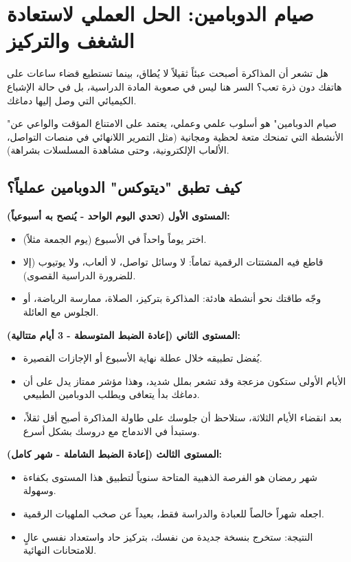 \documentclass[12pt,a4paper]{book}
\begin{document}
	
	
	\section{صيام الدوبامين: الحل العملي لاستعادة الشغف والتركيز}
	
	هل تشعر أن المذاكرة أصبحت عبئاً ثقيلاً لا يُطاق، بينما تستطيع قضاء ساعات على هاتفك دون ذرة تعب؟ السر هنا ليس في صعوبة المادة الدراسية، بل في حالة الإشباع الكيميائي التي وصل إليها دماغك. 
	
	"صيام الدوبامين" هو أسلوب علمي وعملي، يعتمد على الامتناع المؤقت والواعي عن الأنشطة التي تمنحك متعة لحظية ومجانية (مثل التمرير اللانهائي في منصات التواصل، الألعاب الإلكترونية، وحتى مشاهدة المسلسلات بشراهة). 
	
	
	\subsection{كيف تطبق "ديتوكس" الدوبامين عملياً؟}
	
	\textbf{المستوى الأول (تحدي اليوم الواحد - يُنصح به أسبوعياً):}
	\begin{itemize}
		\item اختر يوماً واحداً في الأسبوع (يوم الجمعة مثلاً).
		\item قاطع فيه المشتتات الرقمية تماماً: لا وسائل تواصل، لا ألعاب، ولا يوتيوب (إلا للضرورة الدراسية القصوى).
		\item وجّه طاقتك نحو أنشطة هادئة: المذاكرة بتركيز، الصلاة، ممارسة الرياضة، أو الجلوس مع العائلة.
	\end{itemize}
	
	\textbf{المستوى الثاني (إعادة الضبط المتوسطة - 3 أيام متتالية):}
	\begin{itemize}
		\item يُفضل تطبيقه خلال عطلة نهاية الأسبوع أو الإجازات القصيرة.
		\item الأيام الأولى ستكون مزعجة وقد تشعر بملل شديد، وهذا مؤشر ممتاز يدل على أن دماغك بدأ يتعافى ويطلب الدوبامين الطبيعي.
		\item بعد انقضاء الأيام الثلاثة، ستلاحظ أن جلوسك على طاولة المذاكرة أصبح أقل ثقلاً، وستبدأ في الاندماج مع دروسك بشكل أسرع.
	\end{itemize}
	
	\textbf{المستوى الثالث (إعادة الضبط الشاملة - شهر كامل):}
	\begin{itemize}
		\item شهر رمضان هو الفرصة الذهبية المتاحة سنوياً لتطبيق هذا المستوى بكفاءة وسهولة.
		\item اجعله شهراً خالصاً للعبادة والدراسة فقط، بعيداً عن صخب الملهيات الرقمية.
		\item النتيجة: ستخرج بنسخة جديدة من نفسك، بتركيز حاد واستعداد نفسي عالٍ للامتحانات النهائية.
	\end{itemize}
	
\end{document}
